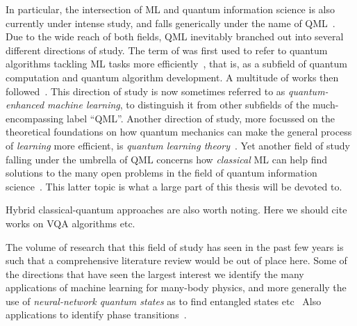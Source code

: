 In particular, the intersection of \ac{ML} and quantum information science is also currently under intense study, and falls generically under the name of \ac{QML}~\cite{wittek2014quantum,schuld2014introduction,adcock2015advances,biamonte2017quantum,arunachalam2017survey}.
Due to the wide reach of both fields, \ac{QML} inevitably branched out into several different directions of study.
The term of was first used to refer to quantum algorithms tackling \ac{ML} tasks more efficiently~\cite{giovannetti2008quantum,harrow2009quantum,lloyd2013quantum,lloyd2014quantum,rebentrost2014quantum,lloyd2016quantum,rebentrost2018quantum,rebentrost2016quantum}, that is, as a subfield of quantum computation and quantum algorithm development. A multitude of works then followed~\cite{wittek2014quantum,schuld2014introduction,dunjko2017machine,ciliberto2018quantum,schuld2018supervised,perdomo-ortiz2018opportunities}. This direction of study is now sometimes referred to as \emph{quantum-enhanced machine learning}, to distinguish it from other subfields of the much-encompassing label ``\ac{QML}''.
Another direction of study, more focussed on the theoretical foundations on how quantum mechanics can make the general process of \emph{learning} more efficient, is \emph{quantum learning theory}~\cite{arunachalam2017survey}.
Yet another field of study falling under the umbrella of \ac{QML} concerns how \emph{classical} \ac{ML} can help find solutions to the many open problems in the field of quantum information science~\cite{spears2018deep,carleo2019machine}.
This latter topic is what a large part of this thesis will be devoted to.

Hybrid classical-quantum approaches are also worth noting. Here we should cite works on VQA algorithms etc.

The volume of research that this field of study has seen in the past few years is such that a comprehensive literature review would be out of place here.
Some of the directions that have seen the largest interest we identify the many applications of machine learning for many-body physics, and more generally the use of \emph{neural-network quantum states} as \ansatz to find entangled states etc~
Also applications to identify phase transitions~.

